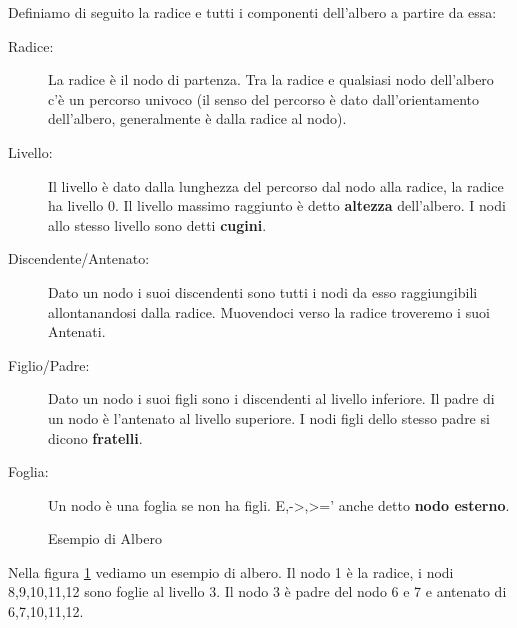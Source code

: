 \begin{definition}
Definiamo di seguito la radice e tutti i componenti dell'albero a partire da essa:\\
\begin{description}
\item[Radice:] La radice è il nodo di partenza. Tra la radice e qualsiasi nodo dell'albero c'è un percorso univoco (il senso del percorso è dato dall'orientamento dell'albero, generalmente è dalla radice al nodo).
\item[Livello:] Il livello è dato dalla lunghezza del percorso dal nodo alla radice, la radice ha livello 0. Il livello massimo raggiunto è detto \textbf{altezza} dell'albero. I nodi allo stesso livello sono detti \textbf{cugini}.
\item[Discendente/Antenato:] Dato un nodo i suoi discendenti sono tutti i nodi da esso raggiungibili allontanandosi dalla radice. Muovendoci verso la radice troveremo i suoi Antenati.
\item[Figlio/Padre:] Dato un nodo i suoi figli sono i discendenti al livello inferiore. Il padre di un nodo è l'antenato al livello superiore. I nodi figli dello stesso padre si dicono \textbf{fratelli}.
\item[Foglia:] Un nodo è una foglia se non ha figli. E,->,>=' anche detto \textbf{nodo esterno}.
\end{description}
\end{definition}
\begin{example}
\begin{figure}[H]
\centering
{}
\caption{Esempio di Albero}\label{fig:albero}
\end{figure}
Nella figura \ref{fig:albero} vediamo un esempio di albero. Il nodo 1 è la radice, i nodi 8,9,10,11,12 sono foglie al livello 3. Il nodo 3 è padre del nodo 6 e 7 e antenato di 6,7,10,11,12. 
\end{example}


